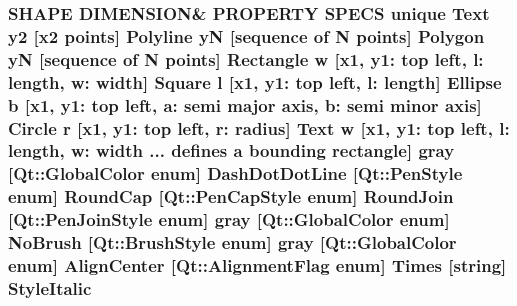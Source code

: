 \subsubsection[{\texorpdfstring{Style\+Italic}{StyleItalic}}]{\setlength{\rightskip}{0pt plus 5cm}S\+H\+A\+PE D\+I\+M\+E\+N\+S\+I\+ON\& P\+R\+O\+P\+E\+R\+TY S\+P\+E\+CS unique {\bf Text} {\bf y2} \mbox{[}{\bf x2} points\mbox{]} {\bf Polyline} yN \mbox{[}sequence of N points\mbox{]} {\bf Polygon} yN \mbox{[}sequence of N points\mbox{]} {\bf Rectangle} w \mbox{[}{\bf x1}, y1\+: top left, l\+: length, w\+: width\mbox{]} {\bf Square} {\bf l} \mbox{[}{\bf x1}, y1\+: top left, l\+: length\mbox{]} {\bf Ellipse} b \mbox{[}{\bf x1}, y1\+: top left, a\+: semi major axis, b\+: semi minor axis\mbox{]} {\bf Circle} r \mbox{[}{\bf x1}, y1\+: top left, r\+: radius\mbox{]} {\bf Text} w \mbox{[}{\bf x1}, y1\+: top left, l\+: length, w\+: width ... defines {\bf a} bounding rectangle\mbox{]} gray \mbox{[}Qt\+::\+Global\+Color enum\mbox{]} Dash\+Dot\+Dot\+Line \mbox{[}Qt\+::\+Pen\+Style enum\mbox{]} Round\+Cap \mbox{[}{\bf Qt\+::\+Pen\+Cap\+Style} enum\mbox{]} Round\+Join \mbox{[}{\bf Qt\+::\+Pen\+Join\+Style} enum\mbox{]} gray \mbox{[}Qt\+::\+Global\+Color enum\mbox{]} No\+Brush \mbox{[}{\bf Qt\+::\+Brush\+Style} enum\mbox{]} gray \mbox{[}Qt\+::\+Global\+Color enum\mbox{]} Align\+Center \mbox{[}Qt\+::\+Alignment\+Flag enum\mbox{]} Times \mbox{[}string\mbox{]} Style\+Italic}\hypertarget{shape__input__file__specs_8txt_af8a30fd7e4ea37d457398e8571f764eb}{}\label{shape__input__file__specs_8txt_af8a30fd7e4ea37d457398e8571f764eb}
